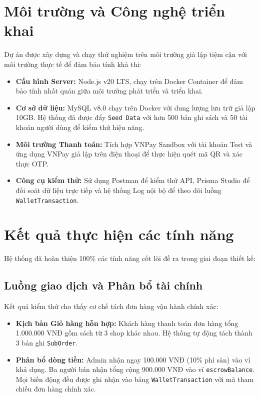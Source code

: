 \documentclass[../main.tex]{subfiles}
\begin{document}
\section{Môi trường và Công nghệ triển khai}
Dự án được xây dựng và chạy thử nghiệm trên môi trường giả lập tiệm cận với môi trường thực tế để đảm bảo tính khả thi:
\begin{itemize}
    \item \textbf{Cấu hình Server:} Node.js v20 LTS, chạy trên Docker Container để đảm bảo tính nhất quán giữa môi trường phát triển và triển khai.
    \item \textbf{Cơ sở dữ liệu:} MySQL v8.0 chạy trên Docker với dung lượng lưu trữ giả lập 10GB. Hệ thống đã được đẩy \texttt{Seed Data} với hơn 500 bản ghi sách và 50 tài khoản người dùng để kiểm thử hiệu năng.
    \item \textbf{Môi trường Thanh toán:} Tích hợp VNPay Sandbox với tài khoản Test và ứng dụng VNPay giả lập trên điện thoại để thực hiện quét mã QR và xác thực OTP.
    \item \textbf{Công cụ kiểm thử:} Sử dụng Postman để kiểm thử API, Prisma Studio để đối soát dữ liệu trực tiếp và hệ thống Log nội bộ để theo dõi luồng \texttt{WalletTransaction}.
\end{itemize}

\section{Kết quả thực hiện các tính năng}
Hệ thống đã hoàn thiện 100\% các tính năng cốt lõi đề ra trong giai đoạn thiết kế:

\subsection{Luồng giao dịch và Phân bổ tài chính}
Kết quả kiểm thử cho thấy cơ chế tách đơn hàng vận hành chính xác:
\begin{itemize}
    \item \textbf{Kịch bản Giỏ hàng hỗn hợp:} Khách hàng thanh toán đơn hàng tổng 1.000.000 VNĐ gồm sách từ 3 shop khác nhau. Hệ thống tự động tách thành 3 bản ghi \texttt{SubOrder}. 
    \item \textbf{Phân bổ dòng tiền:} Admin nhận ngay 100.000 VNĐ (10\% phí sàn) vào ví khả dụng. Ba người bán nhận tổng cộng 900.000 VNĐ vào ví \texttt{escrowBalance}. Mọi biến động đều được ghi nhận vào bảng \texttt{WalletTransaction} với mã tham chiếu đơn hàng chính xác.
\end{itemize}
\end{document}
